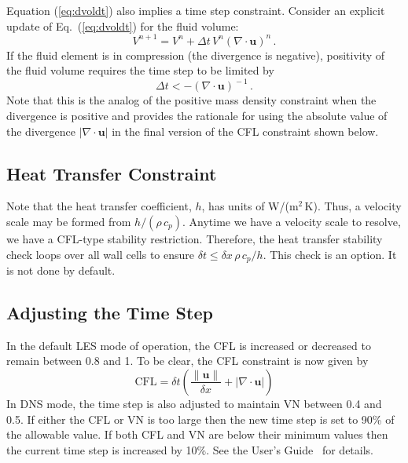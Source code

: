 Equation (\ref{eq:dvoldt}) also implies a time step constraint.  Consider an explicit update of Eq.~(\ref{eq:dvoldt}) for the fluid volume:
\begin{equation}
V^{n+1} = V^n + \Delta t \, V^n (\nabla\cdot\mathbf{u})^{\!n} \,\mbox{.}
\end{equation}
If the fluid element is in compression (the divergence is negative), positivity of the fluid volume requires the time step to be limited by
\begin{equation}
\label{eq:volumedtrestriction}
\Delta t < -(\nabla\cdot\mathbf{u})^{\!-1} \,\mbox{.}
\end{equation}
Note that this is the analog of the positive mass density constraint when the divergence is positive and provides the rationale for using the absolute value of the divergence $|\nabla\cdot\mathbf{u}|$ in the final version of the CFL constraint shown below.

\subsection{Heat Transfer Constraint}

Note that the heat transfer coefficient, $h$, has units of W/(m$^2$\,K).  Thus, a velocity scale may be formed from $h/(\rho\, c_p)$.  Anytime we have a velocity scale to resolve, we have a CFL-type stability restriction.  Therefore, the heat transfer stability check loops over all wall cells to ensure $\delta t \le \delta x \,\rho \,c_p/h$.  This check is an option. It is not done by default.

\subsection{Adjusting the Time Step}

In the default LES mode of operation, the CFL is increased or decreased to remain between 0.8 and 1.  To be clear, the CFL constraint is now given by
\begin{equation}
\mbox{CFL} = \delta t \left( \frac{\|\mathbf{u}\|}{\delta x} + |\nabla\cdot\mathbf{u}| \right)
\end{equation}
In DNS mode, the time step is also adjusted to maintain VN between 0.4 and 0.5. If either the CFL or VN is too large then the new time step is set to 90\% of the allowable value.  If both CFL and VN are below their minimum values then the current time step is increased by 10\%.  See the User's Guide~\cite{FDS_Users_Guide} for details.




